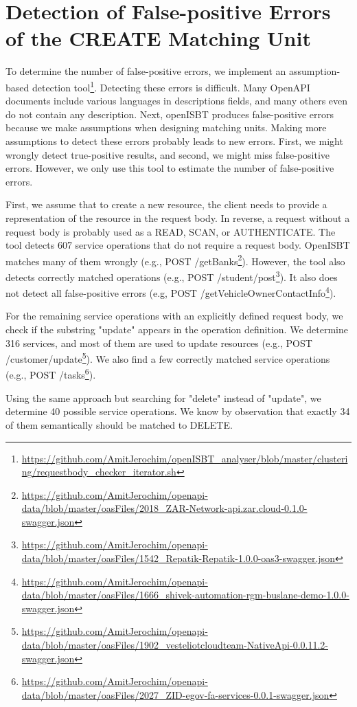 \cleardoublepage
\section{Detection of False-positive Errors of the CREATE Matching Unit}
\label{appendix:assumption_based_detection}


To determine the number of false-positive errors, we implement an assumption-based detection tool\footnote{\url{https://github.com/AmitJerochim/openISBT_analyser/blob/master/clustering/requestbody_checker_iterator.sh}}.
Detecting these errors is difficult. Many OpenAPI documents include various languages in descriptions fields, and many others even do not contain any description. 
Next, openISBT produces false-positive errors because we make assumptions when designing matching units. Making more assumptions to detect these errors probably leads to new errors. First, we might wrongly detect true-positive results, and second, we might miss false-positive errors. However, we only use this tool to estimate the number of false-positive errors. 

First, we assume that to create a new resource, the client needs to provide a representation of the resource in the request body. In reverse, a request without a request body is probably used as a READ, SCAN, or AUTHENTICATE. The tool detects 607 service operations that do not require a request body.
OpenISBT matches many of them wrongly (e.g., POST /getBanks\footnote{\url{https://github.com/AmitJerochim/openapi-data/blob/master/oasFiles/2018_ZAR-Network-api.zar.cloud-0.1.0-swagger.json}}).
However, the tool also detects correctly matched operations (e.g., POST /student/post\footnote{\url{https://github.com/AmitJerochim/openapi-data/blob/master/oasFiles/1542_Repatik-Repatik-1.0.0-oas3-swagger.json}}). It also does not detect all false-positive errors (e.g, POST /getVehicleOwnerContactInfo\footnote{\url{https://github.com/AmitJerochim/openapi-data/blob/master/oasFiles/1666_shivek-automation-rgm-buslane-demo-1.0.0-swagger.json}}).
    
For the remaining service operations with an explicitly defined request body, we check if the substring "update" appears in the operation definition. We determine 316 services, and most of them are used to update resources (e.g., POST /customer/update\footnote{\url{https://github.com/AmitJerochim/openapi-data/blob/master/oasFiles/1902_vesteliotcloudteam-NativeApi-0.0.11.2-swagger.json}}). We also find a few correctly matched service operations (e.g., POST /tasks\footnote{\url{https://github.com/AmitJerochim/openapi-data/blob/master/oasFiles/2027_ZID-egov-fa-services-0.0.1-swagger.json}}).

Using the same approach but searching for "delete" instead of "update", we determine 40 possible service operations. We know by observation that exactly 34 of them semantically should be matched to DELETE.